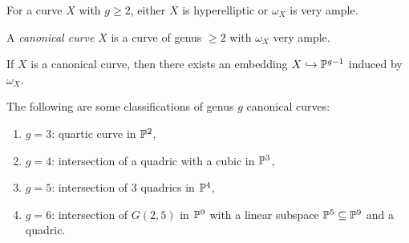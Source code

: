 \begin{theorem}
  For a curve $X$ with
  $g \ge 2$, either $X$ is
  hyperelliptic or $\omega_X$ is very ample.
\end{theorem}

\begin{definition}
  A \emph{canonical curve} $X$ is a curve
  of genus $\ge 2$ with $\omega_X$ very ample.
\end{definition}

\begin{remark}
  If $X$ is a canonical curve, then there
  exists an embedding
  $X \hookrightarrow \mathbb{P}^{g - 1}$ induced by
  $\omega_X$.
\end{remark}

\begin{example}
  The following are some
  classifications of genus $g$ canonical
  curves:
  \begin{enumerate}
    \item $g = 3$: quartic curve in $\mathbb{P}^2$,
    \item $g = 4$: intersection of
      a quadric with a cubic in $\mathbb{P}^3$,
    \item $g = 5$: intersection of
      $3$ quadrics in $\mathbb{P}^4$,
    \item $g = 6$: intersection of
      $G(2, 5)$ in $\mathbb{P}^9$ with a linear
      subspace $\mathbb{P}^5 \subseteq \mathbb{P}^9$ and
      a quadric.
  \end{enumerate}
\end{example}
